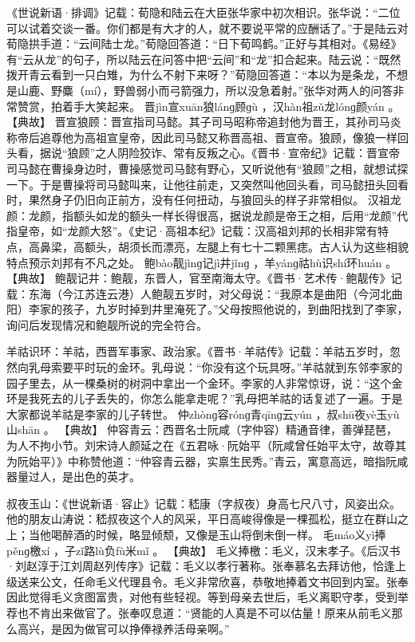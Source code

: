 \documentclass[12pt,UTF8]{ctexbook}
\begin{document}
《世说新语·排调》记载：荀隐和陆云在大臣张华家中初次相识。张华说：“二位可以试着交谈一番。你们都是有大才的人，就不要说平常的应酬话了。”于是陆云对荀隐拱手道：“云间陆士龙。”荀隐回答道：“日下荀鸣鹤。”正好与其相对。《易经》有“云从龙”的句子，所以陆云在问答中把“云间”和“龙”扣合起来。陆云说：“既然拨开青云看到一只白雉，为什么不射下来呀？”荀隐回答道：“本以为是条龙，不想是山鹿、野麋（mí），野兽弱小而弓箭强力，所以没急着射。”张华对两人的问答非常赞赏，拍着手大笑起来。
晋jìn宣xuān狼lánɡ顾ɡù
，汉hàn祖zǔ龙lónɡ颜yán
。
【典故】
晋宣狼顾：晋宣指司马懿。其子司马昭称帝追封他为晋王，其孙司马炎称帝后追尊他为高祖宣皇帝，因此司马懿又称晋高祖、晋宣帝。狼顾，像狼一样回头看，据说“狼顾”之人阴险狡诈、常有反叛之心。《晋书·宣帝纪》记载：晋宣帝司马懿在曹操身边时，曹操感觉司马懿有野心，又听说他有“狼顾”之相，就想试探一下。于是曹操将司马懿叫来，让他往前走，又突然叫他回头看，司马懿扭头回看时，果然身子仍旧向正前方，没有任何扭动，与狼回头的样子非常相似。
汉祖龙颜：龙颜，指额头如龙的额头一样长得很高，据说龙颜是帝王之相，后用“龙颜”代指皇帝，如“龙颜大怒”。《史记·高祖本纪》记载：汉高祖刘邦的长相非常有特点，高鼻梁，高额头，胡须长而漂亮，左腿上有七十二颗黑痣。古人认为这些相貌特点预示刘邦有不凡之处。
鲍bào靓jìnɡ记jì井jǐnɡ
，羊yánɡ祜hù识shí环huán
。
【典故】
鲍靓记井：鲍靓，东晋人，官至南海太守。《晋书·艺术传·鲍靓传》记载：东海（今江苏连云港）人鲍靓五岁时，对父母说：“我原本是曲阳（今河北曲阳）李家的孩子，九岁时掉到井里淹死了。”父母按照他说的，到曲阳找到了李家，询问后发现情况和鲍靓所说的完全符合。

羊祜识环：羊祜，西晋军事家、政治家。《晋书·羊祜传》记载：羊祜五岁时，忽然向乳母索要平时玩的金环。乳母说：“你没有这个玩具呀。”羊祜就到东邻李家的园子里去，从一棵桑树的树洞中拿出一个金环。李家的人非常惊讶，说：“这个金环是我死去的儿子丢失的，你怎么能拿走呢？”乳母把羊祜的话复述了一遍。于是大家都说羊祜是李家的儿子转世。
仲zhònɡ容rónɡ青qīnɡ云yún
，叔shū夜yè玉yù山shān
。
【典故】
仲容青云：西晋名士阮咸（字仲容）精通音律，善弹琵琶，为人不拘小节。刘宋诗人颜延之在《五君咏·阮始平（阮咸曾任始平太守，故尊其为阮始平）》中称赞他道：“仲容青云器，实禀生民秀。”青云，寓意高远，暗指阮咸器量过人，是出色的英才。

叔夜玉山：《世说新语·容止》记载：嵇康（字叔夜）身高七尺八寸，风姿出众。他的朋友山涛说：嵇叔夜这个人的风采，平日高峻得像是一棵孤松，挺立在群山之上；当他喝醉酒的时候，略显倾颓，又像是玉山将倒未倒一样。
毛máo义yì捧pěnɡ檄xí
，子zǐ路lù负fù米mǐ
。
【典故】
毛义捧檄：毛义，汉末孝子。《后汉书·刘赵淳于江刘周赵列传序》记载：毛义以孝行著称。张奉慕名去拜访他，恰逢上级送来公文，任命毛义代理县令。毛义非常欣喜，恭敬地捧着文书回到内室。张奉因此觉得毛义贪图富贵，对他有些轻视。等到母亲去世后，毛义离职守孝，受到举荐也不肯出来做官了。张奉叹息道：“贤能的人真是不可以估量！原来从前毛义那么高兴，是因为做官可以挣俸禄养活母亲啊。”
\end{document}
